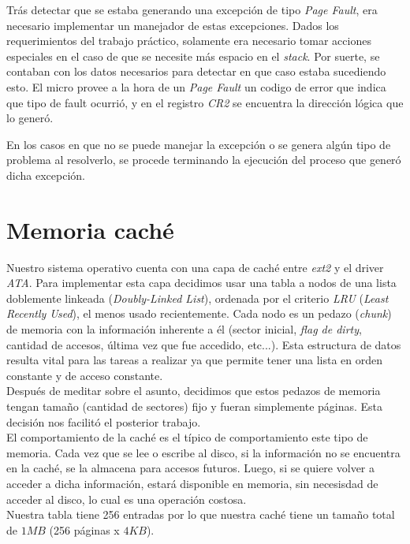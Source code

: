 \documentclass[a4paper,10pt]{article}
\begin{document}
Trás detectar que se estaba generando una excepción de tipo \textit{Page Fault}, era necesario implementar un manejador de estas excepciones.
Dados los requerimientos del trabajo práctico, solamente era necesario tomar acciones especiales en el caso de que se necesite más espacio en el \textit{stack}.
Por suerte, se contaban con los datos necesarios para detectar en que caso estaba sucediendo esto.
El micro provee a la hora de un \textit{Page Fault} un codigo de error que indica que tipo de fault ocurrió, y en el registro \textit{CR2} se encuentra la dirección 
lógica que lo generó.

En los casos en que no se puede manejar la excepción o se genera algún tipo de problema al resolverlo, se procede terminando la ejecución del proceso que 
generó dicha excepción.

\newpage

\section{Memoria caché}
\label{sec:Memoria caché}
Nuestro sistema operativo cuenta con una capa de caché entre \textit{ext2} y el driver \textit{ATA}. Para implementar esta capa decidimos usar una tabla 
a nodos de una lista doblemente linkeada (\textit{Doubly-Linked List}), ordenada por el criterio \textit{LRU} (\textit{Least Recently Used}), el menos usado
 recientemente. Cada nodo es un pedazo (\textit{chunk}) de memoria con la información inherente a él (sector inicial, \textit{flag de dirty}, 
cantidad de accesos, última vez que fue accedido, etc...). Esta estructura de datos resulta vital para las tareas a realizar ya que permite tener una lista
en orden constante y de acceso constante.\\

Después de meditar sobre el asunto, decidimos que estos pedazos de memoria tengan tamaño (cantidad de sectores)
fijo y fueran simplemente páginas. Esta decisión nos facilitó el posterior trabajo.\\

El comportamiento de la caché es el típico de comportamiento este tipo de memoria. Cada vez que se lee o escribe al disco, si la información no se encuentra en la caché, se
 la almacena para accesos futuros. Luego, si se quiere volver a acceder a dicha información, estará disponible en memoria, sin necesisdad de acceder al disco, lo 
cual es una operación costosa.\\


Nuestra tabla tiene 256 entradas por lo que nuestra caché tiene un tamaño total de $1 MB$ (256 páginas x $4 KB$).\\
\end{document}
